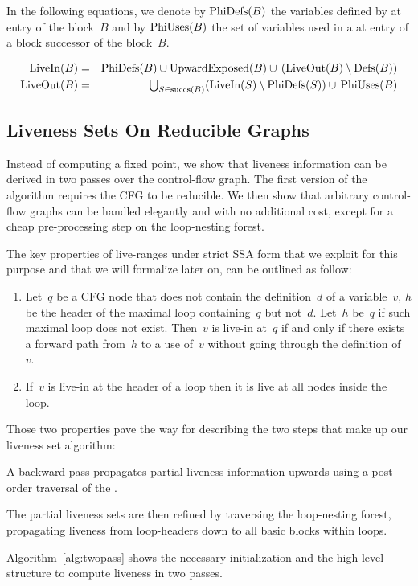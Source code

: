 In the following equations, we denote by $\textrm{PhiDefs}(B)$ the variables defined by \phifuns at entry of the block~$B$ and by $\textrm{PhiUses}(B)$ the set of variables used in a \phifun at entry of a block successor of the block~$B$.

\begin{eqnarray*}
	\textrm{LiveIn}(B) & = & \textrm{PhiDefs}(B) \cup \textrm{UpwardExposed}(B) \cup \,(\textrm{LiveOut}(B)\setminus \textrm{Defs}(B)) \\
	\textrm{LiveOut}(B)& = &
	\textstyle \bigcup_{S \in \textrm{succs}(B)} (\textrm{LiveIn}(S) \setminus
	\textrm{PhiDefs}(S)) \cup\, \textrm{PhiUses}(B)
\end{eqnarray*}

\subsection{Liveness Sets On Reducible Graphs}
\label{sec:forreducible}

Instead of computing a fixed point, we show that liveness information can be derived in two passes over the control-flow graph.
The first version of the algorithm requires the CFG to be reducible.
We then show that arbitrary control-flow graphs can be handled elegantly and with no additional cost, except for a cheap pre-processing step on the loop-nesting forest.

The key properties of live-ranges under strict SSA form that we exploit for this purpose and that we will formalize later on, can be outlined as follow:
\begin{enumerate}
\item
	Let~$q$ be a CFG node that does not contain the definition~$d$ of a variable~$v$, $h$ be the header of the maximal loop containing~$q$ but not~$d$.
	Let~$h$ be~$q$ if such maximal loop does not exist.
	Then~$v$ is live-in at~$q$ if and only if there exists a forward path from~$h$ to a use of~$v$ without going through the definition of~$v$.
\item
	If~$v$ is live-in at the header of a loop then it is live at all nodes inside the loop.
\end{enumerate}
Those two properties pave the way for describing the two steps that make up our liveness set algorithm:
\begin{compactenum}
\item
	A backward pass propagates partial liveness information upwards using a post-order traversal of the \@CFG.
\item
	The partial liveness sets are then refined by traversing the loop-nesting forest, propagating liveness from loop-headers down to all basic blocks within loops.
\end{compactenum}
Algorithm~\ref{alg:twopass} shows the necessary initialization and the high-level structure to compute liveness in two passes.

